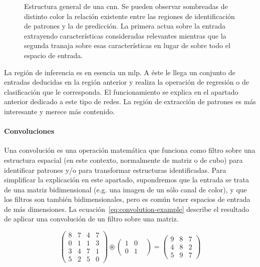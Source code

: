 \begin{figure}
	\caption[Estructura general de una \acl{cnn}]{Estructura general de una \acl{cnn}. Se pueden observar sombreadas de distinto color la relación existente entre las regiones de identificación de patrones y la de predicción. La primera actua sobre la entrada extrayendo características consideradas relevantes mientras que la segunda tranaja sobre esas características en lugar de sobre todo el espacio de entrada.}
	\label{fig:cnn-general-structure}
\end{figure}

La región de inferencia es en esencia un \ac{mlp}. A éste le llega un conjunto de entradas deducidas en la región anterior y realiza la operación de regresión o de clasificación que le corresponda. El funcionamiento se explica en el apartado anterior dedicado a este tipo de redes. La región de extracción de patrones es más interesante y merece más contenido.

\paragraph{Convoluciones}

Una convolución es una operación matemática que funciona como filtro sobre una estructura espacial (en este contexto, normalmente de matriz o de cubo) para identificar patrones y/o para transformar estructuras identificadas. Para simplificar la explicación en este apartado, supondremos que la entrada se trata de una matriz bidimensional (e.g. una imagen de un sólo canal de color), y que los filtros son también bidimensionales, pero es común tener espacios de entrada de más dimensiones. La ecuación~\ref{eq:convolution-example} describe el resultado de aplicar una convolución de un filtro sobre una matriz.

\begin{equation*}
	\begin{pmatrix}
		8 & 7 & 4 & 7  \\
		0 & 1 & 1 & 3  \\
		3 & 4 & 7 & 1  \\
		5 & 2 & 5 & 0
	\end{pmatrix}
	\circledast
	\begin{pmatrix}
		1 & 0 &  \\
		0 & 1
	\end{pmatrix}
	=
	\begin{pmatrix}
		9 & 8 & 7  \\
		4 & 8 & 2  \\
		5 & 9 & 7
	\end{pmatrix}
	\label{eq:convolution-example}
\end{equation*}

